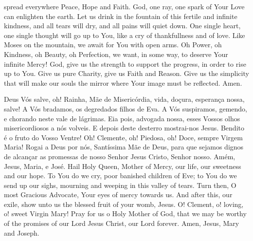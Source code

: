 {\begin{songs}{}
        spread everywhere Peace, Hope and Faith.
        \ind God, one ray, one spark of Your Love can enlighten
        the earth.
        \ind Let us drink in the fountain of this fertile and
        infinite kindness, and all tears will dry, and all pains
        will quiet down.
        \ind One single heart, one single thought will go up to
        You, like a cry of thankfullness and of love.
        \ind Like Moses on the mountain, we await for You with
        open arms.
        \ind Oh Power, oh Kindness, oh Beauty, oh Perfection,
        we want, in some way, to deserve Your infinite Mercy!
        \ind God, give us the strength to support the progress,
        in order to rise up to You.
        \ind Give us pure Charity, give us Faith and Reason.
        \ind Give us the simplicity that will make our souls the
        mirror where Your image must be reflected.
        \parspace
        Amen.
      \endverse
    \endsong


      \beginverse
        Deus Vós salve, oh! Rainha, Mãe de Misericórdia,
        vida, doçura, esperança nossa, salve!
        \ind A Vós bradamos, os degredados filhos de Eva.
        \ind A Vós suspiramos, gemendo, e chorando neste
        vale de lágrimas.
        \ind Eia pois, advogada nossa, esses Vossos olhos
        misericordiosos a nós volveis.
        \ind E depois deste desterro mostrai-nos Jesus.
        \ind Bendito é o fruto do Vosso Ventre!
        \ind Oh! Clemente, oh! Piedosa, oh! Doce, sempre
        Virgem Maria!
        \ind Rogai a Deus por nós, Santíssima Mãe de Deus,
        para que sejamos dignos de alcançar as promessas
        de nosso Senhor Jesus Cristo, Senhor nosso.
        \parspace
        Amém, Jesus, Maria, e José.
      \endverse
      \beginverse
        Hail Holy Queen, Mother of Mercy, our life, our
        sweetness and our hope.
        \ind To You do we cry, poor banished children of Eve;
        \ind to You do we send up our sighs, mourning and
        weeping in this valley of tears.
        \ind Turn then, O most Gracious Advocate, Your eyes
        of mercy towards us.
        \ind And after this, our exile, show unto us the
        blessed fruit of your womb, Jesus.
        \ind O! Clement, o! loving, o! sweet Virgin Mary!
        \ind Pray for us o Holy Mother of God, that we may
        be worthy of the promises of our Lord Jesus Christ,
        our Lord forever.
        \parspace
        Amen, Jesus, Mary and Joseph.
      \endverse
    \endsong



\end{songs}}
